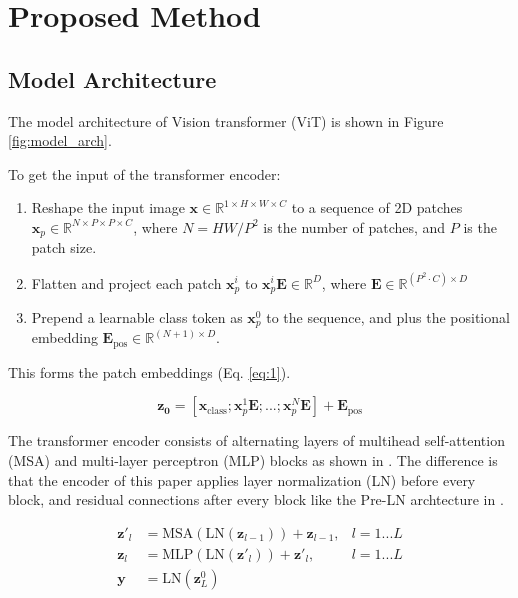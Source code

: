 \documentclass[12pt]{article}
\begin{document}

\section{Proposed Method}

\subsection{Model Architecture}

The model architecture of Vision transformer (ViT) is shown in Figure \ref{fig:model_arch}.

To get the input of the transformer encoder:

\begin{enumerate}
    \item Reshape the input image $\mathbf{x} \in \mathbb{R}^{1 \times H \times W \times C}$ to a sequence of 2D patches $\mathbf{x}_p \in \mathbb{R}^{N \times P \times P \times C}$, where $N = HW/P^2$ is the number of patches, and $P$ is the patch size.
    \item Flatten and project each patch $\mathbf{x}_p^i$ to $\mathbf{x}_p^i\mathbf{E} \in \mathbb{R}^D$, where $\mathbf{E} \in \mathbb{R}^{(P^2 \cdot C) \times D}$
    \item Prepend a learnable class token as $\mathbf{x}_p^0$ to the sequence, and plus the positional embedding $\mathbf{E}_\text{pos} \in \mathbb{R}^{(N+1) \times D}$.
\end{enumerate}

This forms the patch embeddings (Eq. \ref{eq:1}).

\begin{equation}
    \mathbf{z_0} = [\mathbf{x}_\text{class}; \mathbf{x}_p^1\mathbf{E}; ...; \mathbf{x}_p^N\mathbf{E}] + \mathbf{E}_\text{pos} \label{eq:1}
\end{equation}

The transformer encoder consists of alternating layers of multihead self-attention (MSA) and multi-layer perceptron (MLP) blocks as shown in \cite{vaswani_attention_2023}. The difference is that the encoder of this paper applies layer normalization (LN) before every block, and residual connections after every block like the Pre-LN archtecture in \cite{xiong_layer_2020}.

\begin{align}
    \mathbf{z'}_{l} &= \text{MSA}(\text{LN}(\mathbf{z}_{l-1})) + \mathbf{z}_{l-1}, & l = 1 ... L \\
    \mathbf{z}_{l} &= \text{MLP}(\text{LN}(\mathbf{z'}_{l})) + \mathbf{z'}_{l}, & l = 1 ... L \\
    \mathbf{y} &= \text{LN}(\mathbf{z}_{L}^0)
\end{align}
\end{document}
